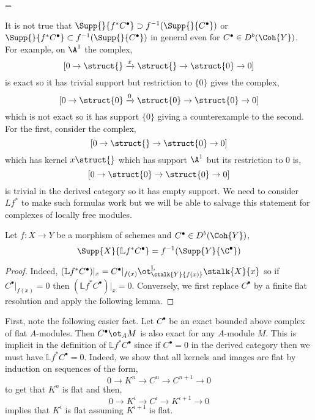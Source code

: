 =\documentclass[12pt]{article}
\begin{document}
\begin{rmk}
It is not true that $\Supp{}{f^* C^\bullet} \supset f^{-1}(\Supp{}{C^\bullet})$ or $\Supp{}{f^* C^\bullet} \subset f^{-1}(\Supp{}{C^\bullet})$ in general even for $C^\bullet \in D^b(\Coh{Y})$. For example, on $\A^1$ the complex,
\[ [0 \to \struct{} \xrightarrow{x} \struct{} \to \struct{0} \to 0] \]
is exact so it has trivial support but restriction to $\{ 0 \}$ gives the complex,
\[ [0 \to \struct{0} \xrightarrow{0} \struct{0} \to \struct{0} \to 0] \]
which is not exact so it has support $\{ 0 \}$ giving a counterexample to the second. For the first, consider the complex,
\[ [ 0 \to \struct{} \to \struct{0} \to 0] \]
which has kernel $x \struct{}$ which has support $\A^1$ but its restriction to $0$ is,
\[ [0 \to \struct{0} \to \struct{0} \to 0] \]
is trivial in the derived category so it has empty support. We need to consider $L f^*$ to make such formulas work but we will be able to salvage this statement for complexes of locally free modules.
\end{rmk}

\newcommand{\LL}{\mathbb{L}}

\begin{lemma}
Let $f : X \to Y$ be a morphism of schemes and $C^\bullet \in D^b(\Coh{Y})$,
\[ \Supp{X}{\LL f^* C^\bullet} = f^{-1}(\Supp{Y}{\C^\bullet}) \]
\end{lemma}

\begin{proof}
Indeed, $(\LL f^* C^\bullet)|_{x} = C^\bullet|_{f(x)} \ot^{\LL}_{\stalk{Y}{f(x)}} \stalk{X}{x}$ so if $C^\bullet|_{f(x)} = 0$ then $(\LL f^* C^\bullet)|_x = 0$. Conversely, we first replace $C^\bullet$ by a finite flat resolution and apply the following lemma.
\end{proof}

\begin{rmk}
First, note the following easier fact. Let $C^\bullet$ be an exact bounded above complex of flat $A$-modules. Then $C^\bullet \ot_A M$ is also exact for any $A$-module $M$. This is implicit in the definition of $\LL f^* C^\bullet$ since if $C^\bullet = 0$ in the derived category then we must have $\LL f^* C^\bullet = 0$. Indeed, we show that all kernels and images are flat by induction on sequences of the form,
\[ 0 \to K^n \to C^n \to C^{n+1} \to 0 \]
to get that $K^n$ is flat and then,
\[ 0 \to K^i \to C^i \to K^{i+1} \to 0 \]
implies that $K^i$ is flat assuming $K^{i+1}$ is flat. 
\end{rmk}
\end{document}
